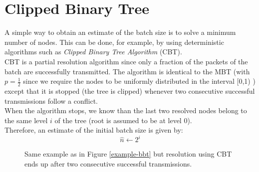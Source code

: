 \documentclass[11pt,a4paper,twoside,openright]{book}
\begin{document}
\section{Clipped Binary Tree}
\label{cbt-estimation}
A simple way to obtain an estimate of the batch size is to solve a minimum number of nodes. This can be done, for example, by using deterministic algorithms such as \emph{Clipped Binary Tree Algorithm} (CBT).\\
CBT is a partial resolution algorithm since only a fraction of the packets of the batch are successfully transmitted.
The algorithm is identical to the MBT (with $\displaystyle p=\frac{1}{2}$ since we require the nodes to be uniformly distributed in the interval [0,1) ) except that it is stopped (the tree is clipped) whenever two consecutive successful transmissions follow a conflict.\\
When the algorithm stops, we know than the last two resolved nodes belong to the same level $i$ of the tree (root is assumed to be at level 0).\\
Therefore, an estimate of the initial batch size is given by:
\begin{equation}
\hat{n}\gets2^{i}
\end{equation}

\begin{figure}[H]
\centering
{}
\caption[\emph{CBT}: example]{ Same example as in Figure \ref{example-bbt} but resolution using CBT ends up after two consecutive successful transmissions.}
\end{figure}
\end{document}
